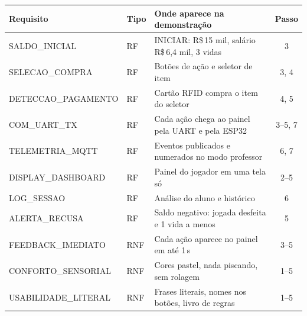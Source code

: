 \documentclass[11pt,a4paper]{article}
\begin{document}
\begin{center}
\begin{tabularx}{\linewidth}{@{}l l X c@{}}
\toprule
\rowcolor{verdeclaro}Requisito & Tipo & Onde aparece na demonstração & Passo\\
\midrule
SALDO\_INICIAL & RF & INICIAR: R\$\,15 mil, salário R\$\,6,4 mil, 3 vidas & 3\\
SELECAO\_COMPRA & RF & Botões de ação e seletor de item & 3, 4\\
DETECCAO\_PAGAMENTO & RF & Cartão RFID compra o item do seletor & 4, 5\\
COM\_UART\_TX & RF & Cada ação chega ao painel pela UART e pela ESP32 & 3--5, 7\\
TELEMETRIA\_MQTT & RF & Eventos publicados e numerados no modo professor & 6, 7\\
DISPLAY\_DASHBOARD & RF & Painel do jogador em uma tela só & 2--5\\
LOG\_SESSAO & RF & Análise do aluno e histórico & 6\\
ALERTA\_RECUSA & RF & Saldo negativo: jogada desfeita e 1 vida a menos & 5\\
FEEDBACK\_IMEDIATO & RNF & Cada ação aparece no painel em até 1\,s & 3--5\\
CONFORTO\_SENSORIAL & RNF & Cores pastel, nada piscando, sem rolagem & 1--5\\
USABILIDADE\_LITERAL & RNF & Frases literais, nomes nos botões, livro de regras & 1--5\\
\bottomrule
\end{tabularx}
\end{center}
\end{document}
